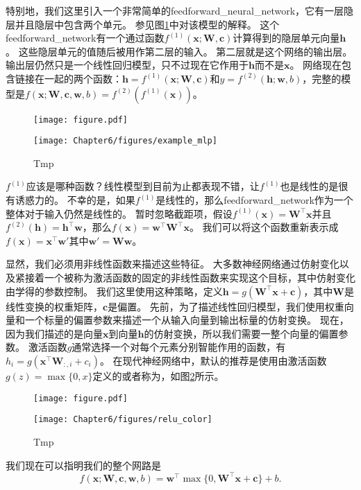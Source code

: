 特别地，我们这里引入一个非常简单的\gls{feedforward_neural_network}，它有一层隐层并且隐层中包含两个单元。
参见图\ref{fig:chap6_example_mlp}中对该模型的解释。
这个\gls{feedforward_network}有一个通过函数$f^{(1)}(\bm{x};\bm{W}, \bm{c})$计算得到的隐层单元向量$\bm{h}$。
这些隐层单元的值随后被用作第二层的输入。
第二层就是这个网络的输出层。
输出层仍然只是一个线性回归模型，只不过现在它作用于$\bm{h}$而不是$\bm{x}$。
网络现在包含链接在一起的两个函数：$\bm{h}=f^{(1)}(\bm{x}; \bm{W}, \bm{c})$和$y = f^{(2)}(\bm{h}; \bm{w}, b)$，完整的模型是$f(\bm{x}; \bm{W}, \bm{c}, \bm{w}, b) = f^{(2)}(f^{(1)}(\bm{x}))$。
\begin{figure}[!htb]
\ifOpenSource
\centerline{\texttt{[image: figure.pdf]}}
\else
\centerline{\texttt{[image: Chapter6/figures/example\_mlp]}}
\fi
\caption{Tmp}
\label{fig:chap6_example_mlp}
\end{figure}


$f^{(1)}$应该是哪种函数？线性模型到目前为止都表现不错，让$f^{(1)}$也是线性的是很有诱惑力的。
不幸的是，如果$f^{(1)}$是线性的，那么\gls{feedforward_network}作为一个整体对于输入仍然是线性的。
暂时忽略截距项，假设$f^{(1)}(\bm{x})= \bm{W}^\top \bm{x}$并且$f^{(2)}(\bm{h})=\bm{h}^\top \bm{w}$，那么$f(\bm{x}) = \bm{w}^\top\bm{W}^\top \bm{x}$。
我们可以将这个函数重新表示成$f(\bm{x}) = \bm{x}^\top\bm{w}'$其中$\bm{w}' = \bm{W}\bm{w}$。


显然，我们必须用非线性函数来描述这些特征。
大多数神经网络通过仿射变化以及紧接着一个被称为激活函数的固定的非线性函数来实现这个目标，其中仿射变化由学得的参数控制。
我们这里使用这种策略，定义$\bm{h}=g(\bm{W}^\top \bm{x}+\bm{c})$，其中$\bm{W}$是线性变换的权重矩阵，$\bm{c}$是偏置。
先前，为了描述线性回归模型，我们使用权重向量和一个标量的偏置参数来描述一个从输入向量到输出标量的仿射变换。
现在，因为我们描述的是向量$\bm{x}$到向量$\bm{h}$的仿射变换，所以我们需要一整个向量的偏置参数。
激活函数$g$通常选择一个对每个元素分别智能作用的函数，有$h_i =g(\bm{x}^\top \bm{W}_{:, i} + c_i)$。
在现代神经网络中，默认的推荐是使用由激活函数$g(z)=\max\{0, x\}$定义的或者称为\citep{Jarrett-ICCV2009-small,Nair-2010-small,Glorot+al-AI-2011-small}，如图\ref{fig:chap6_relu_color}所示。
\begin{figure}[!htb]
\ifOpenSource
\centerline{\texttt{[image: figure.pdf]}}
\else
\centerline{\texttt{[image: Chapter6/figures/relu\_color]}}
\fi
\caption{Tmp}
\label{fig:chap6_relu_color}
\end{figure}


我们现在可以指明我们的整个网路是
\begin{equation}
f(\bm{x}; \bm{W}, \bm{c}, \bm{w}, b) = \bm{w}^\top \max\{ 0, \bm{W}^\top \bm{x} + \bm{c} \} +b.
\end{equation}

